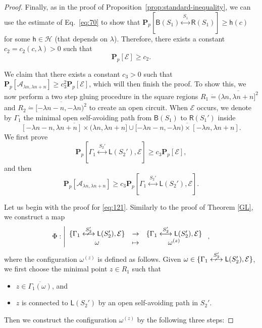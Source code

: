 \documentclass[12pt, twoside,a4paper,reqno]{amsart}
\theoremstyle{plain}
\theoremstyle{remark}
\theoremstyle{definition}
\newcommand{\PP}{\mathbf{P}}
\newcommand{\Pp}[1]{\PP_p \left [ #1 \right ]}
\newcommand{\lr}[1][]{\overset{\:#1\:}\longleftrightarrow}
\newcommand{\nlr}[1][]{\overset{\:#1\:}{\longleftrightarrow}\!\!\!\!\!\!\!\!\!\arrownot
  \ \, \quad}
\newcommand{\ol}{\overline}
\begin{document}
\begin{proof}
Finally, as in the proof of Proposition~\ref{prop:standard-inequality}, we can
use the estimate of Eq.~\eqref{eq:70} to show that $\Pp{\mathsf B(S_1)\lr[S_1]\mathsf R(S_1)}
\ge \mathsf h(c)$ for some $\mathsf h\in\mathcal H$ (that depends on $\lambda$).
Therefore, there exists a constant $c_2=c_2(c,\lambda)>0$ such that
\begin{equation}
  \label{eq:69}
  \Pp{\mathcal E}\ge c_2.
\end{equation}


We claim that there exists a constant $c_3>0$ such that $\Pp{\mathcal A_{\lambda
    n,\lambda n+n}} \ge c_3^2 \Pp{\mathcal E}$, which will then finish the
proof. To show this, we now perform a two step gluing procedure in the square
regions $R_1\dot =\ol{(\lambda n,\lambda n +n]^2}$ and $R_2\dot =\ol{[-\lambda n
  -n ,-\lambda n)^2}$ to create an open circuit. When $\mathcal E$ occurs, we
denote by $\Gamma_1$ the minimal open self-avoiding path  from
$\mathsf B(S_1)$ to $\mathsf R(S_1')$ inside \[\ol{[-\lambda n-n, \lambda n+n]\times (\lambda n,\lambda n+n]}
\cup\ol{[-\lambda n-n, -\lambda n)\times [-\lambda n,\lambda n+n]}.\]
We first prove
\begin{equation}
    \label{eq:121}
    \Pp{\Gamma_1\lr[S_2']\mathsf L(S_2'), \mathcal E}\ge c_3 \Pp{\mathcal E},
  \end{equation}
and then
\begin{equation}
    \label{eq:122}
   \Pp{\mathcal A_{\lambda n,\lambda n+n}} \ge c_3 \Pp{\Gamma_1\lr[S_2']\mathsf L(S_2'), \mathcal E}.
  \end{equation}

  Let us begin with the proof for \eqref{eq:121}. Similarly to the proof of
  Theorem \ref{GL}, we construct a map
  \begin{equation}
    \Phi:
    \left\vert  \begin{array}{ccc}
        \{\Gamma_1\nlr[S_2']\mathsf L(S_2'),  \mathcal E\}&\to&  \{\Gamma_1\lr[S_2']\mathsf L(S_2'), \mathcal E\} \\
        \omega&\mapsto& \omega^{(z)}
      \end{array}
  \right. ,
  \end{equation}
  where the configuration $\omega^{(z)}$ is defined as follows. Given $\omega
  \in \{\Gamma_1\nlr[S_2']\mathsf L(S_2'), \mathcal E\}$, we first choose the
  minimal point $z\in R_1$ such that
  \begin{itemize}
  \item $z \in \ol{\Gamma_1(\omega)}$, and
  \item $z$ is connected to $\mathsf L(S_2')$ by an open self-avoiding path in
    $S_2'$.
  \end{itemize}
  Then we construct the  configuration $\omega^{(z)}$ by the following three
  steps:


\end{proof}
\end{document}
